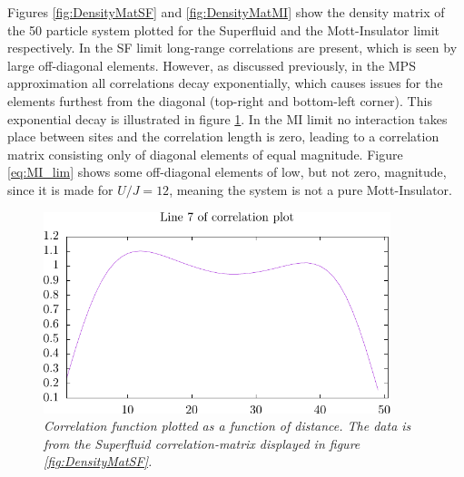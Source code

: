 Figures \ref{fig:DensityMatSF} and \ref{fig:DensityMatMI} show the density matrix of the 50 particle system plotted for the Superfluid and the Mott-Insulator limit respectively. In the SF limit long-range correlations are present, which is seen by large off-diagonal elements. However, as discussed previously, in the MPS approximation all correlations decay exponentially, which causes issues for the elements furthest from the diagonal (top-right and bottom-left corner). This exponential decay is illustrated in figure \ref{fig:expDecayCorrFunc}.
In the MI limit no interaction takes place between sites and the correlation length is zero,  leading to a correlation matrix consisting only of diagonal elements of equal magnitude. Figure \ref{eq:MI_lim} shows some off-diagonal elements of low, but not zero, magnitude, since it is made for $U/J = 12$, meaning the system is not a pure Mott-Insulator.
\begin{figure}[h!]
	\centering
	\includegraphics[width=0.9\textwidth]{Figures/row7DensityMatSF.pdf}
	\caption{\textit{Correlation function plotted as a function of distance. The data is from the Superfluid correlation-matrix displayed in figure \ref{fig:DensityMatSF}.}}
	\label{fig:expDecayCorrFunc}
\end{figure}